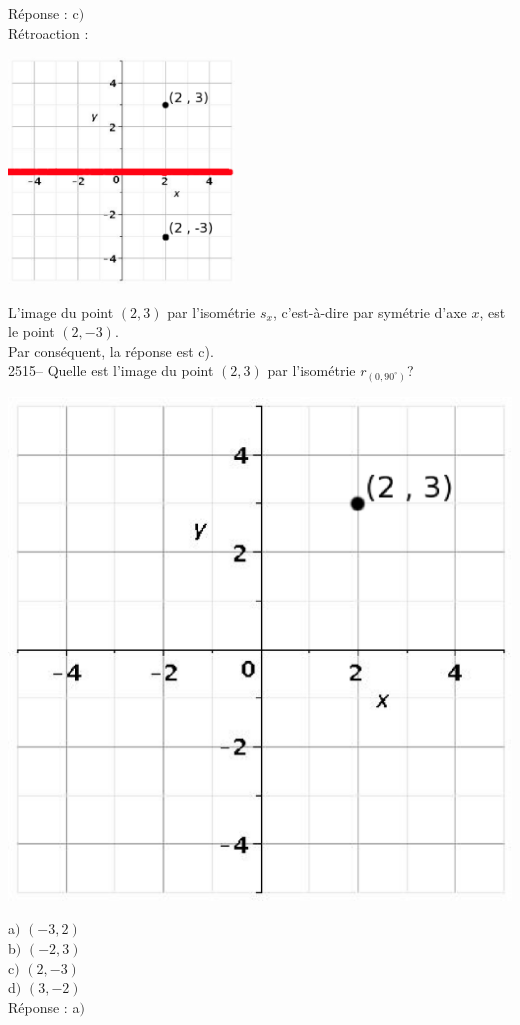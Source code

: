 \documentclass[letterpaper, 12pt]{article}
\begin{document}
R\'eponse : c$)$\\

R\'etroaction :\\
\begin{center}
 \includegraphics[width=6cm,bb=14 14 415 415]{Q2514r.eps}
\end{center}
L'image du point $(2, 3)$ par l'isom\'etrie $s_{x}$, c'est-\`a-dire par sym\'etrie d'axe $x$, est le point $(2, -3)$.\\
Par cons\'equent, la r\'eponse est c).\\

2515-- Quelle est l'image du point $(2, 3)$ par l'isom\'etrie $r_{(0,90^{\circ})}$?\\
\begin{center}
 \includegraphics[width=6 cm,bb=14 14 415 415]{Q2514.eps}
\end{center}

a$)$ $(-3, 2)$\\
b$)$ $(-2, 3)$\\
c$)$ $(2, -3)$\\
d$)$ $(3, -2)$\\

R\'eponse : a$)$\\
\end{document}
